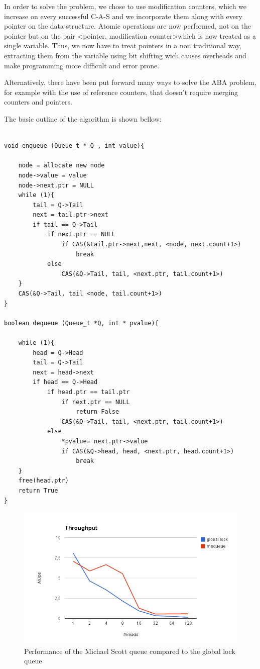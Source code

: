 In order to solve the problem, we chose to use modification counters, which we increase on every successful C-A-S and we incorporate them along with every pointer on the data structure. Atomic operations are now performed, not on the pointer but on the pair \textless pointer, modification counter\textgreater which is now treated as a single variable. Thus, we now have to treat pointers in a non traditional way, extracting them from the variable using bit shifting wich causes overheads and make programming more difficult and error prone. 

Alternatively,  there have been put forward many ways to solve the ABA problem, for example with the use of reference counters, that doesn't require merging counters and pointers.

The basic outline of the algorithm is shown bellow:

\begin{lstlisting}

void enqueue (Queue_t * Q , int value){
	
	node = allocate new node
	node->value = value
	node->next.ptr = NULL
	while (1){
		tail = Q->Tail
		next = tail.ptr->next
		if tail == Q->Tail
			if next.ptr == NULL
				if CAS(&tail.ptr->next,next, <node, next.count+1>)
					break
			else
				CAS(&Q->Tail, tail, <next.ptr, tail.count+1>)  
	}				
	CAS(&Q->Tail, tail <node, tail.count+1>)	
}

boolean dequeue (Queue_t *Q, int * pvalue){
	
	while (1){
		head = Q->Head
		tail = Q->Tail
		next = head->next
		if head == Q->Head
			if head.ptr == tail.ptr
				if next.ptr == NULL
					return False
				CAS(&Q->Tail, tail, <next.ptr, tail.count+1>)
			else
				*pvalue= next.ptr->value
				if CAS(&Q->head, head, <next.ptr, head.count+1>)
					break
	}
	free(head.ptr)
	return True
}

\end{lstlisting}

\begin{figure}
 \centering
  \includegraphics[scale=0.7]{queue_msqueue_perf.png}
 \caption{ Performance of the Michael Scott queue compared to the global lock queue}
\label{queue_msqueue_perf}
\end{figure}

